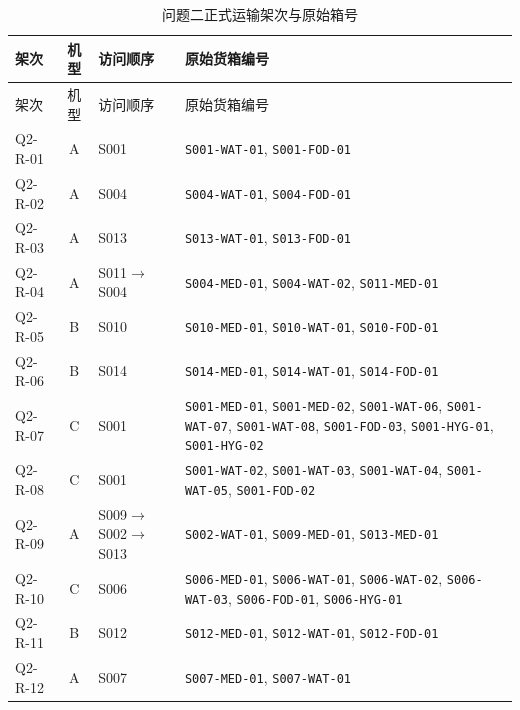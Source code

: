 \begin{longtable}{@{}lc>{\raggedright\arraybackslash}p{2.8cm}>{\raggedright\arraybackslash}p{8.8cm}@{}}
\caption{问题二正式运输架次与原始箱号}\label{tab:app_q2_boxes}\\
\toprule
架次 & 机型 & 访问顺序 & 原始货箱编号\\
\midrule
\endfirsthead
\toprule
架次 & 机型 & 访问顺序 & 原始货箱编号\\
\midrule
\endhead
Q2-R-01 & A & S001 & \texttt{S001-WAT-01}\allowbreak, \texttt{S001-FOD-01}\allowbreak\\
Q2-R-02 & A & S004 & \texttt{S004-WAT-01}\allowbreak, \texttt{S004-FOD-01}\allowbreak\\
Q2-R-03 & A & S013 & \texttt{S013-WAT-01}\allowbreak, \texttt{S013-FOD-01}\allowbreak\\
Q2-R-04 & A & S011$\to$S004 & \texttt{S004-MED-01}\allowbreak, \texttt{S004-WAT-02}\allowbreak, \texttt{S011-MED-01}\allowbreak\\
Q2-R-05 & B & S010 & \texttt{S010-MED-01}\allowbreak, \texttt{S010-WAT-01}\allowbreak, \texttt{S010-FOD-01}\allowbreak\\
Q2-R-06 & B & S014 & \texttt{S014-MED-01}\allowbreak, \texttt{S014-WAT-01}\allowbreak, \texttt{S014-FOD-01}\allowbreak\\
Q2-R-07 & C & S001 & \texttt{S001-MED-01}\allowbreak, \texttt{S001-MED-02}\allowbreak, \texttt{S001-WAT-06}\allowbreak, \texttt{S001-WAT-07}\allowbreak, \texttt{S001-WAT-08}\allowbreak, \texttt{S001-FOD-03}\allowbreak, \texttt{S001-HYG-01}\allowbreak, \texttt{S001-HYG-02}\allowbreak\\
Q2-R-08 & C & S001 & \texttt{S001-WAT-02}\allowbreak, \texttt{S001-WAT-03}\allowbreak, \texttt{S001-WAT-04}\allowbreak, \texttt{S001-WAT-05}\allowbreak, \texttt{S001-FOD-02}\allowbreak\\
Q2-R-09 & A & S009$\to$S002$\to$S013 & \texttt{S002-WAT-01}\allowbreak, \texttt{S009-MED-01}\allowbreak, \texttt{S013-MED-01}\allowbreak\\
Q2-R-10 & C & S006 & \texttt{S006-MED-01}\allowbreak, \texttt{S006-WAT-01}\allowbreak, \texttt{S006-WAT-02}\allowbreak, \texttt{S006-WAT-03}\allowbreak, \texttt{S006-FOD-01}\allowbreak, \texttt{S006-HYG-01}\allowbreak\\
Q2-R-11 & B & S012 & \texttt{S012-MED-01}\allowbreak, \texttt{S012-WAT-01}\allowbreak, \texttt{S012-FOD-01}\allowbreak\\
Q2-R-12 & A & S007 & \texttt{S007-MED-01}\allowbreak, \texttt{S007-WAT-01}\allowbreak\\

\end{longtable}
